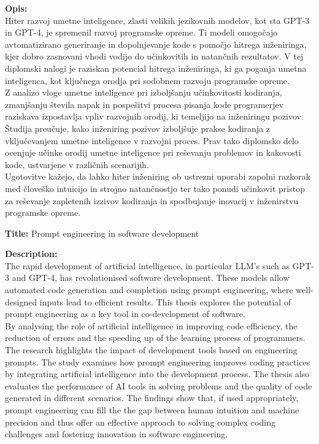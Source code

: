 \documentclass[a4paper,12pt,openright]{book}
\newcommand{\ttitleEn}{Prompt engineering in software development}
\begin{document}
\bigskip
\noindent\textbf{Opis:}\\
Hiter razvoj umetne inteligence, zlasti velikih jezikovnih modelov, kot sta GPT-3 in GPT-4, je spremenil razvoj programske opreme. Ti modeli omogočajo avtomatizirano generiranje in dopolnjevanje kode s pomočjo hitrega inženiringa, kjer dobro zasnovani vhodi vodijo do učinkovitih in natančnih rezultatov. V tej diplomski nalogi je raziskan potencial hitrega inženiringa, ki ga poganja umetna inteligenca, kot ključnega orodja pri sodobnem razvoju programske opreme. \\
Z analizo vloge umetne inteligence pri izboljšanju učinkovitosti kodiranja, zmanjšanju števila napak in pospešitvi procesa pisanja kode programerjev raziskava izpostavlja vpliv razvojnih orodij, ki temeljijo na inženiringu pozivov. Študija preučuje, kako inženiring pozivov izboljšuje prakse kodiranja z vključevanjem umetne inteligence v razvojni proces. Prav tako diplomsko delo ocenjuje učinke orodij umetne inteligence pri reševanju problemov in kakovosti kode, ustvarjene v različnih scenarijih. \\
Ugotovitve kažejo, da lahko hiter inženiring ob ustrezni uporabi zapolni razkorak med človeško intuicijo in strojno natančnostjo ter tako ponudi učinkovit pristop za reševanje zapletenih izzivov kodiranja in spodbujanje inovacij v inženirstvu programske opreme.

\bigskip
\pagebreak
\noindent\textbf{Title:} \ttitleEn

\bigskip
\noindent\textbf{Description:}\\
The rapid development of artificial intelligence, in particular LLM's such as
GPT-3 and GPT-4, has revolutionised software development. These models
allow automated code generation and completion using prompt engineering, where well-designed inputs lead to efficient results. This thesis explores the potential of prompt engineering as a key tool in co-development of software. \\
By analysing the role of artificial intelligence in improving code efficiency,
the reduction of errors and the speeding up of the learning process of programmers.
The research highlights the impact of development tools based on
engineering prompts. The study examines how prompt engineering improves
coding practices by integrating artificial intelligence into the development process.
The thesis also evaluates the performance of AI tools in solving
problems and the quality of code generated in different scenarios.
The findings show that, if used appropriately, prompt engineering can fill the
the gap between human intuition and machine precision and thus offer an effective
approach to solving complex coding challenges and fostering innovation in
software engineering.
\bigskip
\end{document}
